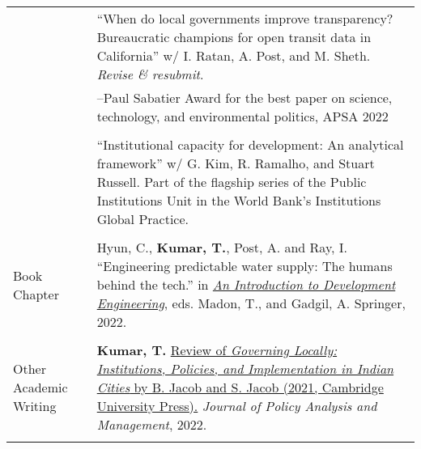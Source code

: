 \documentclass[letterpaper, 10.5pt]{article}
\begin{document}
\begin{longtable}{p{1.5in}p{5in}}
&``When do local governments improve transparency? 
Bureaucratic champions for open transit data in California'' w/ I. Ratan, A. Post, and M. Sheth. \textit{Revise \& resubmit}.\\
&--\indent Paul Sabatier Award for the best paper on science, technology, and environmental politics, APSA 2022\\
& \\
&``Institutional capacity for development: 
An analytical framework'' w/ G. Kim, R. Ramalho, and Stuart Russell. Part of the flagship series of the Public Institutions Unit in the World Bank's Institutions Global Practice.
\\
& \\



{{Book Chapter}} 
& Hyun, C., \textbf{Kumar, T.}, Post, A. and Ray, I. ``Engineering predictable water supply: The humans behind the tech.'' in \href{https://link.springer.com/book/10.1007/978-3-030-86065-3}{\textit{An Introduction to Development Engineering}}, eds. Madon, T., and Gadgil, A. Springer, 2022.\\

& \\

{{Other Academic Writing}} 





& \textbf{Kumar, T.} \href{https://doi.org/10.1002/pam.22390}{Review of \textit{Governing Locally: Institutions, Policies, and Implementation in Indian Cities} by B. Jacob and S. Jacob (2021, Cambridge University Press).}  \textit{Journal of Policy Analysis and Management}, 2022. \\


& \\




\end{longtable}
\end{document}

